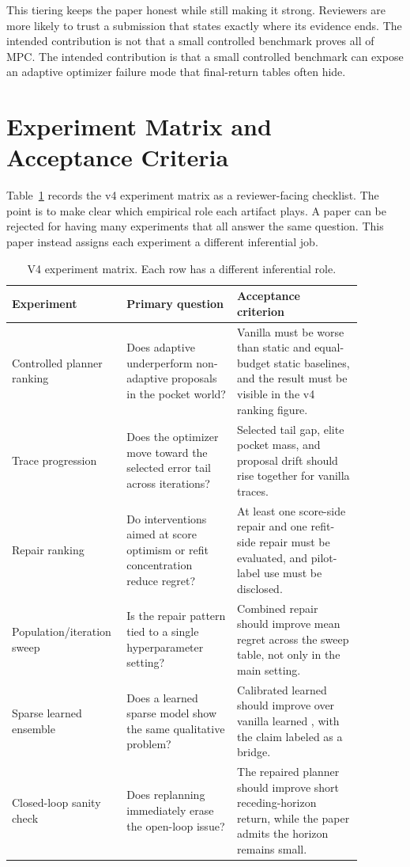 This tiering keeps the paper honest while still making it strong. Reviewers
are more likely to trust a submission that states exactly where its evidence
ends. The intended contribution is not that a small controlled benchmark proves
all of MPC. The intended contribution is that a small controlled benchmark can
expose an adaptive optimizer failure mode that final-return tables often hide.

\section{Experiment Matrix and Acceptance Criteria}
\label{app:experiment-matrix}

Table~\ref{tab:experiment-matrix} records the v4 experiment matrix as a
reviewer-facing checklist. The point is to make clear which empirical role
each artifact plays. A paper can be rejected for having many experiments that
all answer the same question. This paper instead assigns each experiment a
different inferential job.

\begin{table}[t]
\centering
\small
\begin{tabular}{p{0.24\linewidth}p{0.30\linewidth}p{0.34\linewidth}}
\toprule
Experiment & Primary question & Acceptance criterion \\
\midrule
Controlled planner ranking &
Does adaptive \cem{} underperform non-adaptive proposals in the pocket world? &
Vanilla \cem{} must be worse than static and equal-budget static baselines, and
the result must be visible in the v4 ranking figure. \\
Trace progression &
Does the optimizer move toward the selected error tail across iterations? &
Selected tail gap, elite pocket mass, and proposal drift should rise together
for vanilla \cem{} traces. \\
Repair ranking &
Do interventions aimed at score optimism or refit concentration reduce regret? &
At least one score-side repair and one refit-side repair must be evaluated, and
pilot-label use must be disclosed. \\
Population/iteration sweep &
Is the repair pattern tied to a single hyperparameter setting? &
Combined repair should improve mean regret across the sweep table, not only in
the main setting. \\
Sparse learned ensemble &
Does a learned sparse model show the same qualitative problem? &
Calibrated learned \cem{} should improve over vanilla learned \cem{}, with the
claim labeled as a bridge. \\
Closed-loop sanity check &
Does replanning immediately erase the open-loop issue? &
The repaired planner should improve short receding-horizon return, while the
paper admits the horizon remains small. \\
\bottomrule
\end{tabular}
\caption{V4 experiment matrix. Each row has a different inferential role.}
\label{tab:experiment-matrix}
\end{table}

